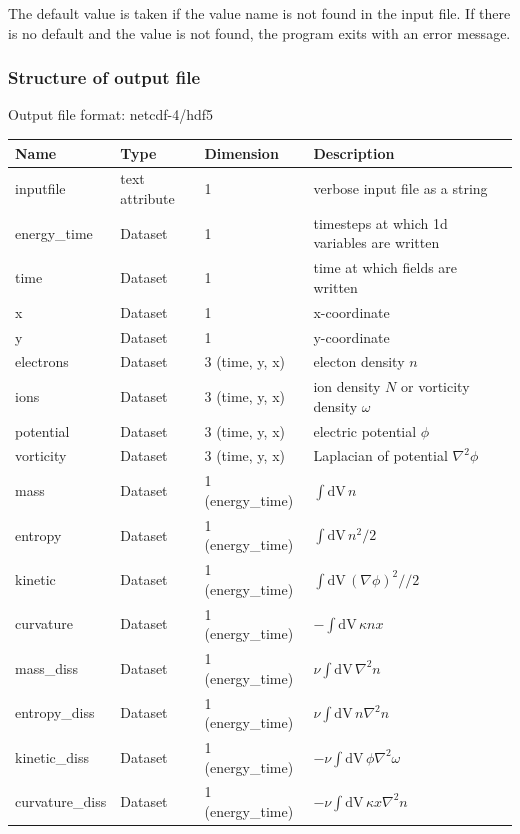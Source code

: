 \documentclass{hitec} %
\newcommand{\dV}{\mathrm{dV}\,}
\begin{document}
The default value is taken if the value name is not found in the input file. If there is no default and
the value is not found,
the program exits with an error message.

\subsubsection{Structure of output file}
Output file format: netcdf-4/hdf5
%
\begin{longtable}{lll>{\RaggedRight}p{7cm}}
\toprule
\rowcolor{gray!50}\textbf{Name} &  \textbf{Type} & \textbf{Dimension} & \textbf{Description}  \\ \midrule
inputfile  &             text attribute & 1 & verbose input file as a string \\
energy\_time             & Dataset & 1 & timesteps at which 1d variables are written \\
time                     & Dataset & 1 & time at which fields are written \\
x                        & Dataset & 1 & x-coordinate  \\
y                        & Dataset & 1 & y-coordinate \\
electrons                & Dataset & 3 (time, y, x) & electon density $n$ \\
ions                     & Dataset & 3 (time, y, x) & ion density $N$ or vorticity density $\omega$  \\
potential                & Dataset & 3 (time, y, x) & electric potential $\phi$  \\
vorticity                & Dataset & 3 (time, y, x) & Laplacian of potential $\nabla^2\phi$  \\
mass                     & Dataset & 1 (energy\_time) & $\int\dV n$  \\
entropy                  & Dataset & 1 (energy\_time) & $\int\dV n^2/2$  \\
kinetic                  & Dataset & 1 (energy\_time) & $\int\dV (\nabla\phi)^2//2$  \\
curvature                & Dataset & 1 (energy\_time) & $-\int\dV \kappa n x$ \\
mass\_diss               & Dataset & 1 (energy\_time) & $\nu \int\dV \nabla^2 n $  \\
entropy\_diss            & Dataset & 1 (energy\_time) & $\nu \int\dV n\nabla^2 n$  \\
kinetic\_diss            & Dataset & 1 (energy\_time) & $-\nu\int\dV\phi \nabla^2 \omega$  \\
curvature\_diss          & Dataset & 1 (energy\_time) & $-\nu\int\dV \kappa x \nabla^2 n$   \\
\bottomrule
\end{longtable}
\end{document}
